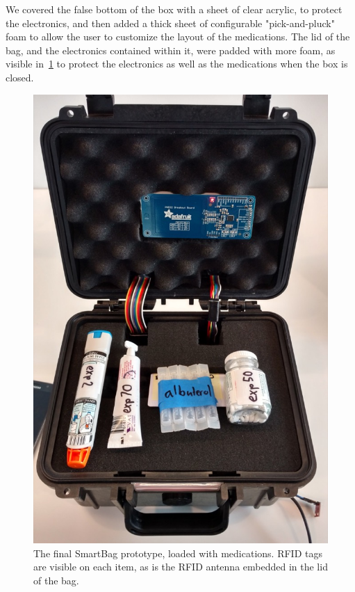 \documentclass{sigchi}
\begin{document}
We covered the false bottom of the box with a sheet of clear acrylic, to
protect the electronics, and then added a thick sheet of configurable
"pick-and-pluck" foam to allow the user to customize the layout of the medications.
The lid of the bag, and the electronics contained within it, were padded with
more foam, as visible in~\ref{fig:final_prototype} to protect the electronics as
well as the medications when the box is closed.

\begin{figure}[!ht]
\centering
\includegraphics[width=\columnwidth]{final_prototype}
\caption{The final SmartBag prototype, loaded with medications.
	RFID tags are visible on each item, as is the RFID antenna
    embedded in the lid of the bag.}
\label{fig:final_prototype}
\end{figure}
\end{document}
